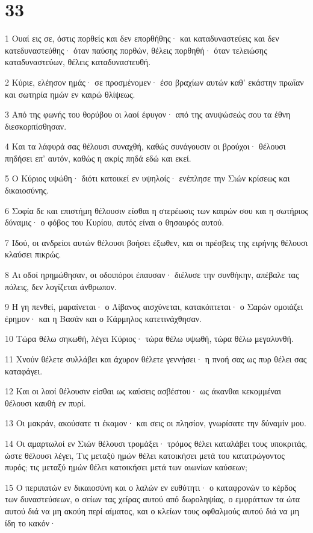 \chapter{33}

\par 1 Ουαί εις σε, όστις πορθείς και δεν επορθήθης· και καταδυναστεύεις και δεν κατεδυναστεύθης· όταν παύσης πορθών, θέλεις πορθηθή· όταν τελειώσης καταδυναστεύων, θέλεις καταδυναστευθή.
\par 2 Κύριε, ελέησον ημάς· σε προσμένομεν· έσο βραχίων αυτών καθ' εκάστην πρωΐαν και σωτηρία ημών εν καιρώ θλίψεως.
\par 3 Από της φωνής του θορύβου οι λαοί έφυγον· από της ανυψώσεώς σου τα έθνη διεσκορπίσθησαν.
\par 4 Και τα λάφυρά σας θέλουσι συναχθή, καθώς συνάγουσιν οι βρούχοι· θέλουσι πηδήσει επ' αυτόν, καθώς η ακρίς πηδά εδώ και εκεί.
\par 5 Ο Κύριος υψώθη· διότι κατοικεί εν υψηλοίς· ενέπλησε την Σιών κρίσεως και δικαιοσύνης.
\par 6 Σοφία δε και επιστήμη θέλουσιν είσθαι η στερέωσις των καιρών σου και η σωτήριος δύναμις· ο φόβος του Κυρίου, αυτός είναι ο θησαυρός αυτού.
\par 7 Ιδού, οι ανδρείοι αυτών θέλουσι βοήσει έξωθεν, και οι πρέσβεις της ειρήνης θέλουσι κλαύσει πικρώς.
\par 8 Αι οδοί ηρημώθησαν, οι οδοιπόροι έπαυσαν· διέλυσε την συνθήκην, απέβαλε τας πόλεις, δεν λογίζεται άνθρωπον.
\par 9 Η γη πενθεί, μαραίνεται· ο Λίβανος αισχύνεται, κατακόπτεται· ο Σαρών ομοιάζει έρημον· και η Βασάν και ο Κάρμηλος κατετινάχθησαν.
\par 10 Τώρα θέλω σηκωθή, λέγει Κύριος· τώρα θέλω υψωθή, τώρα θέλω μεγαλυνθή.
\par 11 Χνούν θέλετε συλλάβει και άχυρον θέλετε γεννήσει· η πνοή σας ως πυρ θέλει σας καταφάγει.
\par 12 Και οι λαοί θέλουσιν είσθαι ως καύσεις ασβέστου· ως άκανθαι κεκομμέναι θέλουσι καυθή εν πυρί.
\par 13 Οι μακράν, ακούσατε τι έκαμον· και σεις οι πλησίον, γνωρίσατε την δύναμίν μου.
\par 14 Οι αμαρτωλοί εν Σιών θέλουσι τρομάξει· τρόμος θέλει καταλάβει τους υποκριτάς, ώστε θέλουσι λέγει, Τις μεταξύ ημών θέλει κατοικήσει μετά του κατατρώγοντος πυρός; τις μεταξύ ημών θέλει κατοικήσει μετά των αιωνίων καύσεων;
\par 15 Ο περιπατών εν δικαιοσύνη και ο λαλών εν ευθύτητι· ο καταφρονών το κέρδος των δυναστεύσεων, ο σείων τας χείρας αυτού από δωροληψίας, ο εμφράττων τα ώτα αυτού διά να μη ακούη περί αίματος, και ο κλείων τους οφθαλμούς αυτού διά να μη ίδη το κακόν·
